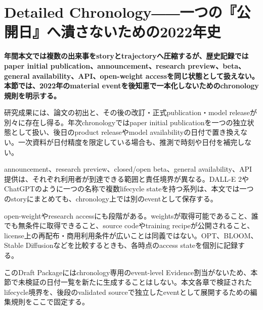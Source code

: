 \section{Detailed Chronology――一つの『公開日』へ潰さないための2022年史}
\noindent\textbf{年間本文では複数の出来事をstoryとtrajectoryへ圧縮するが、歴史記録ではpaper initial publication、announcement、research preview、beta、general availability、API、open-weight accessを同じ状態として扱えない。本節では、2022年のmaterial eventを後知恵で一本化しないためのchronology規則を明示する。}

研究成果には、論文の初出と、その後の改訂・正式publication・model releaseが別々に存在し得る。年次chronologyではpaper initial publicationを一つの独立状態として扱い、後日のproduct releaseやmodel availabilityの日付で置き換えない。一次資料が日付精度を限定している場合も、推測で時刻や日付を補完しない。


announcement、research preview、closed/open beta、general availability、API提供は、それぞれ利用者が到達できる範囲と責任境界が異なる。DALL-E 2やChatGPTのように一つの名称で複数lifecycle stateを持つ系列は、本文では一つのstoryにまとめても、chronology上では別のeventとして保存する。


open-weightやresearch accessにも段階がある。weightsが取得可能であること、誰でも無条件に取得できること、source codeやtraining recipeが公開されること、license上の再配布・商用利用条件が広いことは同義ではない。OPT、BLOOM、Stable Diffusionなどを比較するときも、各時点のaccess stateを個別に記録する。


このDraft Packageにはchronology専用のevent-level Evidence割当がないため、本節で未検証の日付一覧を新たに生成することはしない。本文各章で検証されたlifecycle境界を、後段のvalidated sourceで独立したeventとして展開するための編集規則をここで固定する。
